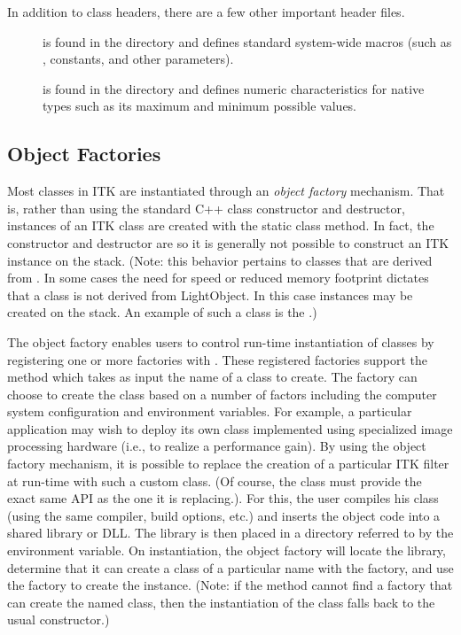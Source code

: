 In addition to class headers, there are a few other important header files.
\begin{description}
    \item[] is found in the
     directory
    and defines standard system-wide macros (such as ,
    constants, and other parameters).

    \item[] is found in the
     directory and defines numeric
    characteristics for native types such as its maximum and minimum
    possible values.
\end{description}

\subsection{Object Factories}
\label{sec:ObjectFactories}


Most classes in ITK are instantiated through an \emph{object factory}
mechanism. That is, rather than using the standard C++ class constructor and
destructor, instances of an ITK class are created with the static class
 method. In fact, the constructor and destructor are
 so it is generally not possible to construct an ITK
instance on the stack. (Note: this behavior pertains to classes that are
derived from . In some cases the need for speed or
reduced memory footprint dictates that a class is not derived from
LightObject. In this case instances may be created on the stack. An
example of such a class is the .)

The object factory enables users to control run-time instantiation of classes
by registering one or more factories with . These
registered factories support the method 
which takes as input the name of a class to create. The factory can choose to
create the class based on a number of factors including the computer system
configuration and environment variables. For example, a particular
application may wish to deploy its own class implemented using
specialized image processing hardware (i.e., to realize a performance
gain). By using the object factory mechanism, it is possible to replace
the creation of a particular ITK filter at run-time with such a custom class.
(Of course, the class must provide the exact same API as the one it is
replacing.). For this, the user compiles his class (using the same compiler,
build options, etc.) and inserts the object code into a shared library or
DLL. The library is then placed in a directory referred to by the
 environment variable. On instantiation, the object
factory will locate the library, determine that it can create a class of a
particular name with the factory, and use the factory to create the
instance. (Note: if the  method cannot find a factory
that can create the named class, then the instantiation of the class falls
back to the usual constructor.)

